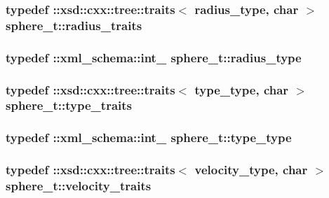 \subsubsection[{\texorpdfstring{radius\+\_\+traits}{radius_traits}}]{\setlength{\rightskip}{0pt plus 5cm}typedef \+::xsd\+::cxx\+::tree\+::traits$<$ {\bf radius\+\_\+type}, char $>$ {\bf sphere\+\_\+t\+::radius\+\_\+traits}}\hypertarget{classsphere__t_aa2048e5e8155003a2716f8a6e5bd9dea}{}\label{classsphere__t_aa2048e5e8155003a2716f8a6e5bd9dea}
\subsubsection[{\texorpdfstring{radius\+\_\+type}{radius_type}}]{\setlength{\rightskip}{0pt plus 5cm}typedef \+::{\bf xml\+\_\+schema\+::int\+\_\+} {\bf sphere\+\_\+t\+::radius\+\_\+type}}\hypertarget{classsphere__t_a7d5046bdba409d8f49e7c9902ae56278}{}\label{classsphere__t_a7d5046bdba409d8f49e7c9902ae56278}
\subsubsection[{\texorpdfstring{type\+\_\+traits}{type_traits}}]{\setlength{\rightskip}{0pt plus 5cm}typedef \+::xsd\+::cxx\+::tree\+::traits$<$ {\bf type\+\_\+type}, char $>$ {\bf sphere\+\_\+t\+::type\+\_\+traits}}\hypertarget{classsphere__t_ad0671f0626314f21b44379bb03b77cea}{}\label{classsphere__t_ad0671f0626314f21b44379bb03b77cea}
\subsubsection[{\texorpdfstring{type\+\_\+type}{type_type}}]{\setlength{\rightskip}{0pt plus 5cm}typedef \+::{\bf xml\+\_\+schema\+::int\+\_\+} {\bf sphere\+\_\+t\+::type\+\_\+type}}\hypertarget{classsphere__t_a458644a173b4fcac645ccb6e0dd1605f}{}\label{classsphere__t_a458644a173b4fcac645ccb6e0dd1605f}
\subsubsection[{\texorpdfstring{velocity\+\_\+traits}{velocity_traits}}]{\setlength{\rightskip}{0pt plus 5cm}typedef \+::xsd\+::cxx\+::tree\+::traits$<$ {\bf velocity\+\_\+type}, char $>$ {\bf sphere\+\_\+t\+::velocity\+\_\+traits}}\hypertarget{classsphere__t_aebe9f6854dfafe65c376fd95c92fd87f}{}\label{classsphere__t_aebe9f6854dfafe65c376fd95c92fd87f}
